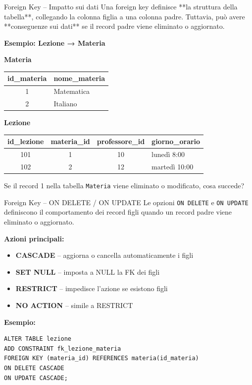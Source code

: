 \documentclass{beamer}
\begin{document}
\begin{frame}[fragile]{Foreign Key -- Impatto sui dati}
\small
Una foreign key definisce **la struttura della tabella**, collegando la colonna figlia a una colonna padre.  
Tuttavia, può avere **conseguenze sui dati** se il record padre viene eliminato o aggiornato.

\medskip
\textbf{Esempio: Lezione → Materia}

\medskip
\textbf{Materia}
\begin{tabular}{|c|l|}
\hline
id\_materia & nome\_materia \\
\hline
1 & Matematica \\
2 & Italiano \\
\hline
\end{tabular}

\medskip
\textbf{Lezione}
\begin{tabular}{|c|c|c|l|}
\hline
id\_lezione & materia\_id & professore\_id & giorno\_orario \\
\hline
101 & 1 & 10 & lunedì 8:00 \\
102 & 2 & 12 & martedì 10:00 \\
\hline
\end{tabular}

\medskip 
Se il record 1 nella tabella \texttt{Materia} viene eliminato o modificato, cosa succede? 
\end{frame} 

\begin{frame}[fragile]{Foreign Key -- ON DELETE / ON UPDATE}
\small
Le opzioni \texttt{ON DELETE} e \texttt{ON UPDATE} definiscono il comportamento dei record figli quando un record padre viene eliminato o aggiornato.

\medskip
\textbf{Azioni principali:}
\begin{itemize}
    \item \textbf{CASCADE} -- aggiorna o cancella automaticamente i figli
    \item \textbf{SET NULL} -- imposta a NULL la FK dei figli
    \item \textbf{RESTRICT} -- impedisce l’azione se esistono figli
    \item \textbf{NO ACTION} -- simile a RESTRICT
\end{itemize}

\medskip
\textbf{Esempio:}

\begin{verbatim}
ALTER TABLE lezione
ADD CONSTRAINT fk_lezione_materia
FOREIGN KEY (materia_id) REFERENCES materia(id_materia)
ON DELETE CASCADE
ON UPDATE CASCADE;
\end{verbatim}
\end{frame}
\end{document}
